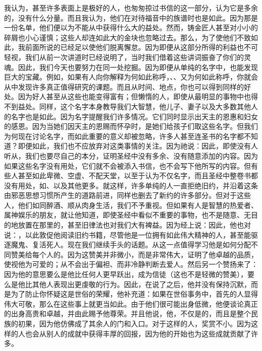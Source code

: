 我认为，甚至许多表面上是极好的人，也匆匆掠过书信的这一部分，认为它是多余的，没有什么分量。而且我认为，他们在对待福音中的族谱时也是如此。因为那是一份名单，他们便以为不能从中获得什么大的益处。然而，铸金匠人甚至对小小的碎屑也小心谨慎；这些人却连如此大的金块也忽略过去。那么，为了使他们不致如此，我前面所说的已经足以使他们脱离懈怠。因为即便从这部分所得的利益也不可轻视，我们从前一次讲道时已经说明了，当时我们借着这些讲词振奋了你们的灵魂。因此，我们今天也要努力在同一处挖掘。因为即便从单纯的名字中，也能发现巨大的宝藏。例如，如果有人向你解释为何如此称呼，、、又为何如此称呼，你就会从中发现许多真正值得研究的课题。而且从时间、地点，你也可以得到同样的好处。因为好人甚至从这些也能变得富有；但懒惰的人，即使从最明显的事物中也得不到益处。同样，这个名字本身教导我们大智慧，他儿子、妻子以及大多数其他人的名字也是如此。因为名字提醒我们许多情况。它们同时显示出天主的恩惠和妇女的感恩。因为当她们因天主的恩赐而怀孕时，是她们给孩子们取这些名字。但我们为何现在讨论名字，而如此重要的意义却被忽略，许多人甚至连圣书的名字都不知道？即便如此，我们也不应放弃对这类事情的关注。因为祂说：因此，即使没有人听从，我们也要尽自己的本分，证明圣经中没有多余、没有随意添加的内容。因为如果这些名字没有用处，它们就不会被添入书信，也不会写下他所写的内容。但有些人甚至如此卑微、空虚、不配天堂，以至于认为不仅名字，而且圣经中整卷书都没有用处，如、以及其他更多。就这样，许多单纯的人一直拒绝旧约，并沿着这条由邪恶思想习惯所产生的道路前进，同样也删去了新约的许多部分。但对于这些人，他们如同醉酒、顺从肉身生活，我们不予重视。但如果有人是智慧的热爱者、属神娱乐的朋友，就让他知道，即使圣经中看似不重要的事物，也不是随意、无目的地放置在那里的，甚至旧律法也对我们大有裨益。因为经上说：因此，他也对说：，以此敦促他阅读旧约书籍，尽管他是一位拥有如此伟大精神的人，甚至能驱逐魔鬼、复活死人。现在我们继续手头的话题。从这一点值得学习他是如何分配不同赞美给每个人的。因为这赞美并非微小，而是非常伟大，证明了他卓越的品质，使视他为可爱的；从不会出于偏袒、而非冷静判断去爱人。然后另一个赞扬来了：因为他的意思要么是他比任何人更早跃出，成为信徒（这也不是轻微的赞美），要么是他比其他人表现出更虔敬的行为。因此，在说了之后，他并没有保持沉默，而是为了防止你怀疑这是世俗的荣耀，他补充道：如果在世俗事务中，首先的人显得伟大可敬，那么在这些事上就更当如此。由于他们很可能出身低微，他便谈论真正的出身高贵和卓越，并由此赐予他尊荣。并且他说，他，不仅是的，而且是整个民族的初果，因为他仿佛成了其余人的门和入口。对于这样的人，奖赏不小。因为这样的人也会从别人的成就中获得丰厚的回报，因为他的开始也为这些成就贡献了许多。\par


